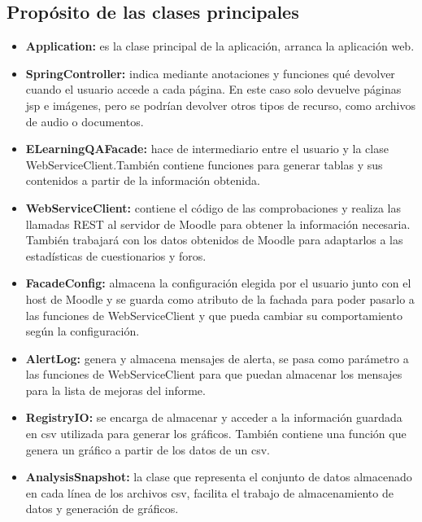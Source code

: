 \subsection{Propósito de las clases principales}
\begin{itemize}
	\item \textbf{Application:} es la clase principal de la aplicación, arranca la aplicación web.
	\item \textbf{SpringController:} indica mediante anotaciones y funciones qué devolver cuando el usuario accede a cada página. En este caso solo devuelve páginas jsp e imágenes, pero se podrían devolver otros tipos de recurso, como archivos de audio o documentos.
	\item \textbf{ELearningQAFacade:} hace de intermediario entre el usuario y la clase WebServiceClient.También contiene funciones para generar tablas y sus contenidos a partir de la información obtenida. 
	\item \textbf{WebServiceClient:} contiene el código de las comprobaciones y realiza las llamadas REST al servidor de Moodle para obtener la información necesaria. También trabajará con los datos obtenidos de Moodle para adaptarlos a las estadísticas de cuestionarios y foros.
	\item \textbf{FacadeConfig:} almacena la configuración elegida por el usuario junto con el host de Moodle y se guarda como atributo de la fachada para poder pasarlo a las funciones de WebServiceClient y que pueda cambiar su comportamiento según la configuración.
	\item \textbf{AlertLog:} genera y almacena mensajes de alerta, se pasa como parámetro a las funciones de WebServiceClient para que puedan almacenar los mensajes para la lista de mejoras del informe.
	\item \textbf{RegistryIO:} se encarga de almacenar y acceder a la información guardada en csv utilizada para generar los gráficos. También contiene una función que genera un gráfico a partir de los datos de un csv.
	\item \textbf{AnalysisSnapshot:} la clase que representa el conjunto de datos almacenado en cada línea de los archivos csv, facilita el trabajo de almacenamiento de datos y generación de gráficos.
\end{itemize}
